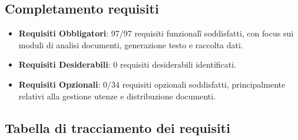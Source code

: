 \documentclass[a4paper,11pt]{article}
\begin{document}
\subsection{Completamento requisiti}
\begin{itemize}
  \item \textbf{Requisiti Obbligatori}: 97/97 requisiti funzionali\G{} soddisfatti, con focus sui moduli di analisi documenti, generazione testo e raccolta dati.
  \item \textbf{Requisiti Desiderabili}: 0 requisiti desiderabili identificati.
  \item \textbf{Requisiti Opzionali}: 0/34 requisiti opzionali soddisfatti, principalmente relativi alla gestione utenze e distribuzione documenti.
\end{itemize}

\subsection{Tabella di tracciamento dei requisiti}

\renewcommand{\arraystretch}{1.2}
\setlength{\tabcolsep}{4pt}

\newcommand{\wCod}{2.2cm}
\newcommand{\wStato}{2.6cm}
\newcommand{\wPrio}{2.8cm}
\newcommand{\wDesc}{%
  \dimexpr\textwidth-\wCod-\wStato-\wPrio-6\tabcolsep-5\arrayrulewidth\relax
}


\newcommand{\autoRF}{%
  \stepcounter{rfCounter}%
  RF-%
  \ifnum\value{rfCounter}<100 0\fi
  \ifnum\value{rfCounter}<10 0\fi
  \arabic{rfCounter}%
}

\setcounter{rfCounter}{0}
\end{document}
